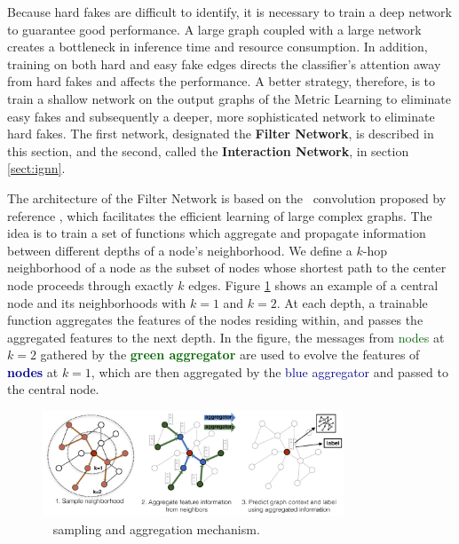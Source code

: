Because hard fakes are difficult to identify, it is necessary to train a deep network to guarantee good performance. 
A large graph coupled with a large network creates a bottleneck in inference time and resource consumption. 
In addition, training on both hard and easy fake edges directs the classifier's attention away from hard fakes and affects the performance.
A better strategy, therefore, is to train a shallow network on the output graphs of the Metric Learning to eliminate easy fakes and subsequently a deeper, more sophisticated network to eliminate hard fakes. 
The first network, designated the \textbf{Filter Network}, is described in this section, and the second, called the \textbf{Interaction Network}, in section \ref{sect:ignn}.

The architecture of the Filter Network is based on the \graphsage~convolution proposed by reference \cite{graphsage}, which facilitates the efficient learning of large complex graphs.
The idea is to train a set of functions which aggregate and propagate information between different depths of a node's neighborhood.
We define a $k$-hop neighborhood of a node as the subset of nodes whose shortest path to the center node proceeds through exactly $k$ edges.
Figure \ref{fig:filter-sage} shows an example of a \textcolor{reddish}{central node} and its neighborhoods with $k=1$ and $k=2$.
At each depth, a trainable function aggregates the features of the nodes residing within, and passes the aggregated features to the next depth.
In the figure, the messages from \textcolor{darkgreen}{nodes} at $k=2$ gathered by the \textcolor{darkgreen}{\textbf{ green aggregator}} are used to evolve the features of \textcolor{darkblue}{\textbf{nodes}} at $k=1$, which are then aggregated by the \textcolor{darkblue}{blue aggregator} and passed to the \textcolor{reddish}{central node}.

\begin{figure}[h!]
    \centering
    \includegraphics[width=0.8\textwidth]{figures/sample_and_agg.png}
    \caption{\graphsage~ sampling and aggregation mechanism. \cite{graphsage}}
    \label{fig:filter-sage}
\end{figure}


